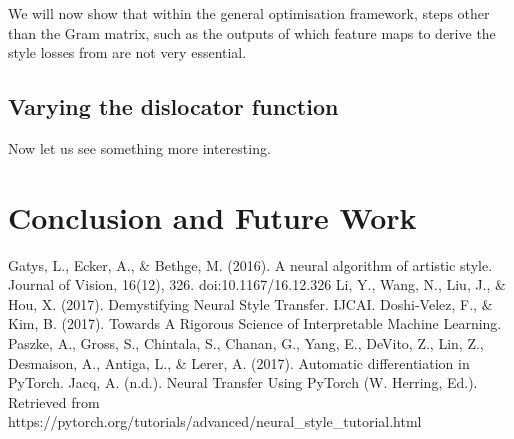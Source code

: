 \documentclass[runningheads]{llncs}
\begin{document}
We will now show that within the general optimisation framework,
steps other than the Gram matrix, 
such as the outputs of which feature maps to derive the style 
losses from are not very essential.

\subsection{Varying the dislocator function}

Now let us see something more interesting.


\section{Conclusion and Future Work}

\begin{thebibliography}{8}
Gatys, L., Ecker, A., \& Bethge, M. (2016). A neural algorithm of artistic style. Journal of Vision, 16(12), 326. doi:10.1167/16.12.326
Li, Y., Wang, N., Liu, J., \& Hou, X. (2017). Demystifying Neural Style Transfer. IJCAI.
Doshi-Velez, F., \& Kim, B. (2017). Towards A Rigorous Science of Interpretable Machine Learning.
Paszke, A., Gross, S., Chintala, S., Chanan, G., Yang, E., DeVito, Z., Lin, Z., Desmaison, A., Antiga, L., \& Lerer, A. (2017). Automatic differentiation in PyTorch.
Jacq, A. (n.d.). Neural Transfer Using PyTorch (W. Herring, Ed.). Retrieved from https://pytorch.org/tutorials/advanced/neural\_style\_tutorial.html
\end{thebibliography}
\end{document}
